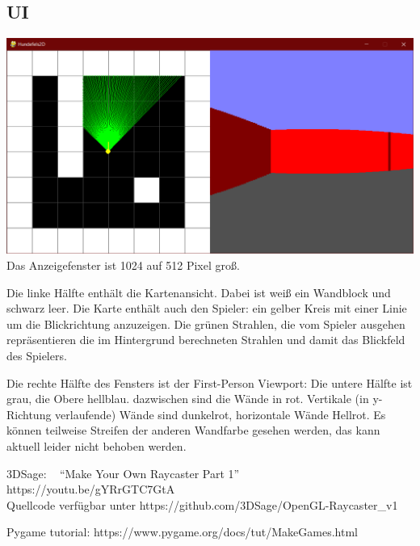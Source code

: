 \documentclass[a4paper,titlepage]{article}
\begin{document}
\subsection{UI}
\includegraphics[scale=1.11]{./img/ui}\\

Das Anzeigefenster ist 1024 auf 512 Pixel groß.

Die linke Hälfte enthält die Kartenansicht. Dabei ist weiß ein Wandblock und schwarz leer. Die  Karte enthält auch den Spieler: ein gelber Kreis mit einer Linie um die Blickrichtung anzuzeigen. Die grünen Strahlen, die vom Spieler ausgehen repräsentieren die im Hintergrund berechneten Strahlen und damit das Blickfeld des Spielers.

Die rechte Hälfte des Fensters ist der First-Person Viewport: Die untere Hälfte ist grau, die Obere hellblau. dazwischen sind die Wände in rot. Vertikale (in y-Richtung verlaufende) Wände sind dunkelrot, horizontale Wände Hellrot. Es können teilweise Streifen der anderen Wandfarbe gesehen werden, das kann aktuell leider nicht behoben werden.

\newpage

\begin{flushleft}
\begin{thebibliography}{99}
	
 3DSage: ~ ``Make Your Own Raycaster Part 1'' ~ https://youtu.be/gYRrGTC7GtA\\ Quellcode verfügbar unter https://github.com/3DSage/OpenGL-Raycaster\_v1

 Pygame tutorial: 	https://www.pygame.org/docs/tut/MakeGames.html
\end{thebibliography}
\end{flushleft}
\end{document}
